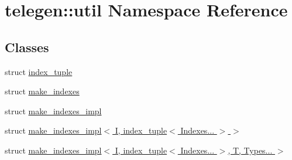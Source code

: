 \hypertarget{namespacetelegen_1_1util}{}\section{telegen\+:\+:util Namespace Reference}
\label{namespacetelegen_1_1util}
\subsection*{Classes}
\begin{DoxyCompactItemize}
\item 
struct \hyperlink{structtelegen_1_1util_1_1index__tuple}{index\+\_\+tuple}
\item 
struct \hyperlink{structtelegen_1_1util_1_1make__indexes}{make\+\_\+indexes}
\item 
struct \hyperlink{structtelegen_1_1util_1_1make__indexes__impl}{make\+\_\+indexes\+\_\+impl}
\item 
struct \hyperlink{structtelegen_1_1util_1_1make__indexes__impl_3_01I_00_01index__tuple_3_01Indexes_8_8_8_01_4_01_4}{make\+\_\+indexes\+\_\+impl$<$ I, index\+\_\+tuple$<$ Indexes... $>$ $>$}
\item 
struct \hyperlink{structtelegen_1_1util_1_1make__indexes__impl_3_01I_00_01index__tuple_3_01Indexes_8_8_8_01_4_00_01T_00_01Types_8_8_8_01_4}{make\+\_\+indexes\+\_\+impl$<$ I, index\+\_\+tuple$<$ Indexes... $>$, T, Types... $>$}
\end{DoxyCompactItemize}
